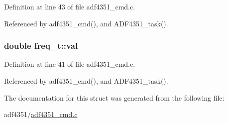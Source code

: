 Definition at line 43 of file adf4351\+\_\+cmd.\+c.



Referenced by adf4351\+\_\+cmd(), and A\+D\+F4351\+\_\+task().

\subsubsection[{\texorpdfstring{val}{val}}]{\setlength{\rightskip}{0pt plus 5cm}double freq\+\_\+t\+::val}\hypertarget{structfreq__t_ab480b23ec23b99ffd3e4d628de27676d}{}\label{structfreq__t_ab480b23ec23b99ffd3e4d628de27676d}


Definition at line 41 of file adf4351\+\_\+cmd.\+c.



Referenced by adf4351\+\_\+cmd(), and A\+D\+F4351\+\_\+task().



The documentation for this struct was generated from the following file\+:\begin{DoxyCompactItemize}
\item 
adf4351/\hyperlink{adf4351__cmd_8c}{adf4351\+\_\+cmd.\+c}\end{DoxyCompactItemize}
